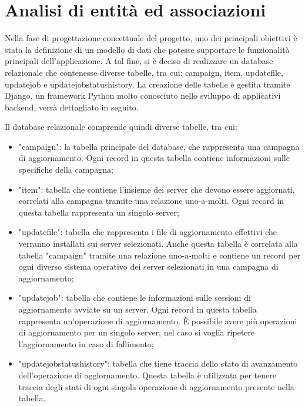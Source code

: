 %
%
\section{Analisi di entità ed associazioni}
Nella fase di progettazione concettuale del progetto, uno dei principali
obiettivi è stata la definizione di un modello di dati che potesse 
supportare le funzionalità principali dell'applicazione.
A tal fine, si è deciso di realizzare un database relazionale che 
contenesse diverse tabelle, tra cui: campaign, item, updatefile, 
updatejob e updatejobstatushistory. La creazione delle tabelle è gestita 
tramite Django, un framework Python molto conosciuto nello sviluppo di 
applicativi backend, verrà dettagliato in seguito.

Il database relazionale comprende quindi diverse tabelle, tra cui:
\begin{itemize}
\item "campaign": la tabella principale del database, che rappresenta una 
campagna di aggiornamento. Ogni record in questa tabella contiene 
informazioni sulle specifiche della campagna;
\item "item": tabella che contiene l'insieme dei server che devono essere 
aggiornati, correlati alla campagna tramite una relazione uno-a-molti. 
Ogni record in questa tabella rappresenta un singolo server;
\item "updatefile": tabella che rappresenta i file di aggiornamento 
effettivi che verranno installati sui server selezionati. 
Anche questa tabella è correlata alla tabella "campaign" tramite una 
relazione uno-a-molti e contiene un record per ogni diverso sistema 
operativo dei server selezionati in una campagna di aggiornamento;
\item "updatejob": tabella che contiene le informazioni sulle sessioni 
di aggiornamento avviate su un server. Ogni record in questa tabella 
rappresenta un'operazione di aggiornamento. È possibile avere più operazioni 
di aggiornamento per un singolo server, nel caso si voglia ripetere 
l’aggiornamento in caso di fallimento;
\item "updatejobstatushistory": tabella che tiene traccia dello stato di 
avanzamento dell’operazione di aggiornamento. Questa tabella è utilizzata 
per tenere traccia degli stati di ogni singola operazione di aggiornamento 
presente nella tabella.
\end{itemize}

